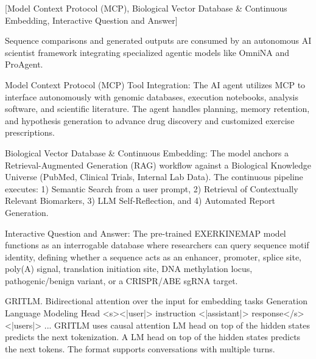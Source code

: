 \documentclass[11pt]{article}
\begin{document}
[Model Context Protocol (MCP), Biological Vector Database \& Continuous Embedding, Interactive Question and Answer]

Sequence comparisons and generated outputs are consumed by an autonomous AI scientist framework integrating specialized agentic models like OmniNA and ProAgent.

Model Context Protocol (MCP) Tool Integration: The AI agent utilizes MCP to interface autonomously with genomic databases, execution notebooks, analysis software, and scientific literature. The agent handles planning, memory retention, and hypothesis generation to advance drug discovery and customized exercise prescriptions.

Biological Vector Database \& Continuous Embedding: The model anchors a Retrieval-Augmented Generation (RAG) workflow against a Biological Knowledge Universe (PubMed, Clinical Trials, Internal Lab Data). The continuous pipeline executes: 1) Semantic Search from a user prompt, 2) Retrieval of Contextually Relevant Biomarkers, 3) LLM Self-Reflection, and 4) Automated Report Generation.

Interactive Question and Answer: The pre-trained EXERKINEMAP model functions as an interrogable database where researchers can query sequence motif identity, defining whether a sequence acts as an enhancer, promoter, splice site, poly(A) signal, translation initiation site, DNA methylation locus, pathogenic/benign variant, or a CRISPR/ABE sgRNA target.

GRITLM. Bidirectional attention over the input for embedding tasks
Generation 
Language Modeling Head
<s><|user|>
{instruction}
<|assistant|>
{response}</s>
<|users|>
...
GRITLM uses causal attention LM head on top of the hidden states predicts the next tokenization. A LM head on top of the hidden states predicts the next tokens.  The format supports conversations with multiple turns. 
\end{document}
